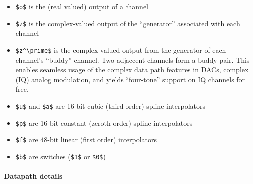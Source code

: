 \begin{itemize}
	\item
	\texttt{\$o\$} is the (real valued) output of a channel
	\item
	\texttt{\$z\$} is the complex-valued output of the ``generator''
	associated with each channel
	\item
	\texttt{\$z\^{}\textbackslash{}prime\$} is the complex-valued output
	from the generator of each channel's ``buddy'' channel. Two adjaccent
	channels form a buddy pair. This enables seamless usage of the complex
	data path features in DACs, complex (IQ) analog modulation, and yields
	``four-tone'' support on IQ channels for free.
	\item
	\texttt{\$u\$} and \texttt{\$a\$} are 16-bit cubic (third order)
	spline interpolators
	\item
	\texttt{\$p\$} are 16-bit constant (zeroth order) spline interpolators
	\item
	\texttt{\$f\$} are 48-bit linear (first order) interpolators
	\item
	\texttt{\$b\$} are switches (\texttt{\$1\$} or \texttt{\$0\$})
\end{itemize}

\paragraph{Datapath details}\label{datapath-details}

